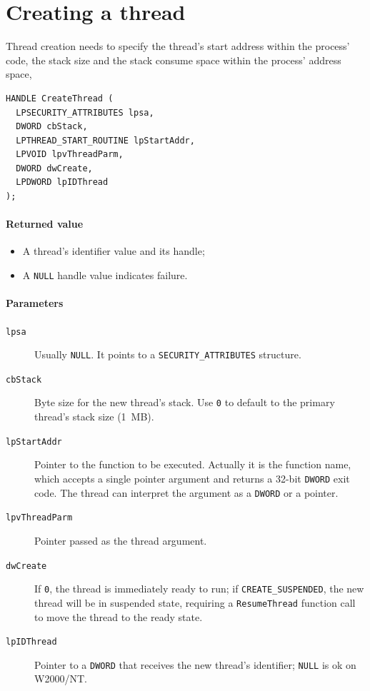 \section{Creating a thread}
Thread creation needs to specify the thread's start address within the process' code, the stack size and the stack consume space within the process' address space, 

\begin{verbatim}
HANDLE CreateThread (
  LPSECURITY_ATTRIBUTES lpsa,
  DWORD cbStack,
  LPTHREAD_START_ROUTINE lpStartAddr,
  LPVOID lpvThreadParm,
  DWORD dwCreate,
  LPDWORD lpIDThread
);
\end{verbatim}

\paragraph{Returned value}
\begin{itemize}
\item A thread's identifier value and its handle;
\item A \texttt{NULL} handle value indicates failure.
\end{itemize}

\paragraph{Parameters}
\begin{description}
\item [\texttt{lpsa}] Usually \texttt{NULL}. It points to a \texttt{SECURITY\_ATTRIBUTES} structure.
\item [\texttt{cbStack}] Byte size for the new thread's stack. Use \texttt{0} to default to the primary thread's stack size (1~MB).
\item [\texttt{lpStartAddr}] Pointer to the function to be executed. Actually it is the function name, which accepts a single pointer argument and returns a 32-bit \texttt{DWORD} exit code. The thread can interpret the argument as a \texttt{DWORD} or a pointer.
\item [\texttt{lpvThreadParm}] Pointer passed as the thread argument.
\item [\texttt{dwCreate}] If \texttt{0}, the thread is immediately ready to run; if \texttt{CREATE\_SUSPENDED}, the new thread will be in suspended state, requiring a \texttt{ResumeThread} function call to move the thread to the ready state.
\item [\texttt{lpIDThread}] Pointer to a \texttt{DWORD} that receives the new thread's identifier; \texttt{NULL} is ok on W2000/NT.
\end{description}

